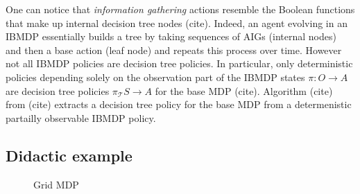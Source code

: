 One can notice that \textit{information gathering} actions resemble the Boolean functions that make up internal decision tree nodes (cite). 
Indeed, an agent evolving in an IBMDP essentially builds a tree by taking sequences of AIGs (internal nodes) and then a base action (leaf node) and repeats this process over time.
However not all IBMDP policies are decision tree policies. In particular, only deterministic policies depending solely on the observation part of the IBMDP states $\pi: O \rightarrow A$ are decision tree policies $\pi_{\mathcal{T}} S \rightarrow A$ for the base MDP (cite).
Algorithm (cite) from (cite) extracts a decision tree policy for the base MDP from a determenistic partailly observable IBMDP policy.

\subsection{Didactic example}
\begin{figure}[h]
\centering
{}
\caption{Grid MDP}
\end{figure}

